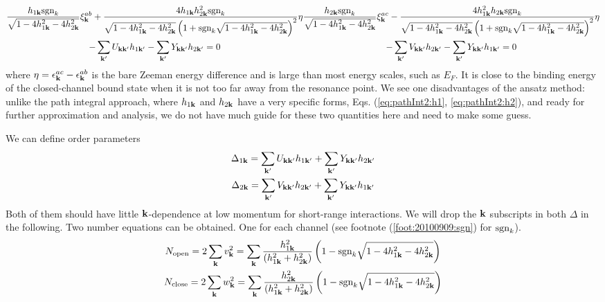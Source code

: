 \begin{subequations}\label{eq:20100909:fullgap}
\begin{multline}
\frac{h_{1\vk}\sgn_k}{\sqrt{1-4 h_{1\vk}^2-4 h_{2\vk}^2}} \xi^{ab}_{\vk}+\frac{4 h_{1\vk} h_{2\vk}^2\sgn_{k}}{\sqrt{1-4 h_{1\vk}^2-4 h_{2\vk}^2} \left(1+\sgn_{k}\sqrt{1-4 h_{1\vk}^2-4 h_{2\vk}^2}\right)^2}\eta\\
-\sum_{\vk'}U_{\vk\vk'}h_{1\vk'}-\sum_{\vk'}Y_{\vk\vk'}h_{2\vk'}=0
\label{eq:20100909:fullgapa}
\end{multline}
\begin{multline}
\frac{h_{2\vk}\sgn_k}{\sqrt{1-4 h_{1\vk}^2-4 h_{2\vk}^2}} \xi^{ac}_{\vk}-\frac{4 h_{1\vk}^{2} h_{2\vk}\sgn_{k}}{\sqrt{1-4 h_{1\vk}^2-4 h_{2\vk}^2} \left(1+\sgn_{k}\sqrt{1-4 h_{1\vk}^2-4 h_{2\vk}^2}\right)^2}\eta\\
-\sum_{\vk'}V_{\vk\vk'}h_{2\vk'}-\sum_{\vk'}Y_{\vk\vk'}h_{1\vk'}=0
\label{eq:20100909:fullgapb}
\end{multline}
\end{subequations}
where $\eta=\epsilon^{ac}_{\mathbf{k}}-\epsilon^{ab}_{\mathbf{k}}$ is the bare Zeeman energy difference and is large than most energy scales, such as $E_{F}$.  It is close to  the binding energy of the closed-channel bound state when it is not too far away from the resonance point.   We see one  disadvantages of the ansatz method: unlike the path integral approach, where $h_{1\mathbf{k}}$ and $h_{2\mathbf{k}}$ have a very specific forms, Eqs. (\ref{eq:pathInt2:h1}, \ref{eq:pathInt2:h2}), and ready for further approximation and analysis,  we do not have much guide for these two quantities here and need to make some guess.  

We can define order parameters
\begin{gather}
\Delta_{1\mathbf{k}}=\sum_{\mathbf{k}'}U_{\mathbf{k}\mathbf{k}'}h_{1\mathbf{k}'}+\sum_{\mathbf{k}'}Y_{\mathbf{k}\mathbf{k}'}h_{2\mathbf{k}'}\\
\Delta_{2\mathbf{k}}=\sum_{\mathbf{k}'}V_{\mathbf{k}\mathbf{k}'}h_{2\mathbf{k}'}+\sum_{\mathbf{k}'}Y_{\mathbf{k}\mathbf{k}'}h_{1\mathbf{k}'}
\end{gather}
Both of them should have little $\mathbf{k}$-dependence at low momentum for short-range interactions.  We will drop the $\mathbf{k}$ subscripts in both $\Delta$ in the following. 
Two number equations can be obtained.  One for each channel (see footnote (\ref{foot:20100909:sgn}) for $\text{sgn}_{k}$).
\begin{subequations}\label{eq:20100909:number}
\begin{gather}
N_{\text{open}}=2\sum_{\mathbf{k}}v_{\mathbf{k}}^{2}
	=\sum_{\mathbf{k}}\frac{ h_{1\mathbf{k}}^2}{( h_{1\mathbf{k}}^2+ h_{2\mathbf{k}}^2)} \left(1-\text{sgn}_{k}\sqrt{1-4 h_{1\mathbf{k}}^2-4 h_{2\mathbf{k}}^2}\right)
	\label{eq:meanfield:opennum}\\
N_{\text{close}}=2\sum_{\mathbf{k}}w_{\mathbf{k}}^{2}
	=\sum_{\mathbf{k}}\frac{ h_{2\mathbf{k}}^2}{( h_{1\mathbf{k}}^2+ h_{2\mathbf{k}}^2)} \left(1-\text{sgn}_{k}\sqrt{1-4 h_{1\mathbf{k}}^2-4 h_{2\mathbf{k}}^2}\right)
\end{gather} 
\end{subequations}


